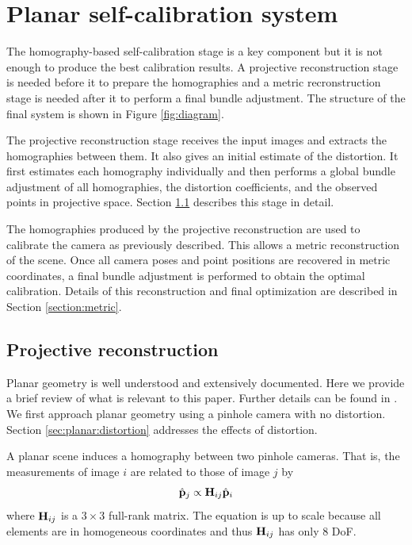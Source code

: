 \documentclass[10pt,twocolumn,letterpaper]{article}
\begin{document}
\section{Planar self-calibration system}

The homography-based self-calibration stage is a key component but it is not enough to produce the best calibration results. A projective reconstruction stage is needed before it to prepare the homographies and a metric recronstruction stage is needed after it to perform a final bundle adjustment. The structure of the final system is shown in Figure \ref{fig:diagram}.

The projective reconstruction stage receives the input images and extracts the homographies between them. It also gives an initial estimate of the distortion. It first estimates each homography individually and then performs a global bundle adjustment of all homographies, the distortion coefficients, and the observed points in projective space. Section \ref{sec:projective} describes this stage in detail.

The homographies produced by the projective reconstruction are used to calibrate the camera as previously described. This allows a metric reconstruction of the scene. Once all camera poses and point positions are recovered in metric coordinates, a final bundle adjustment is performed to obtain the optimal calibration. Details of this reconstruction and final optimization are described in Section \ref{section:metric}.


\subsection{Projective reconstruction}
\label{sec:projective}

Planar geometry is well understood and extensively documented. Here we provide a brief review of what is relevant to this paper. Further details can be found in \cite{hartley2000}. We first approach planar geometry using a pinhole camera with no distortion. Section \ref{sec:planar:distortion} addresses the effects of distortion.

A planar scene induces a homography between two pinhole cameras. That is, the measurements of image $i$ are related to those of image $j$ by
%
\begin{align}
\hat{\mathbf{p}}_j \propto \mathbf{H}_{ij} \hat{\mathbf{p}}_i 
\label{eq:homography}
\end{align}
%
where $\mathbf{H}_{ij}$ is a $3 \times 3$ full-rank matrix. The equation is up to scale because all elements are in homogeneous coordinates and thus $\mathbf{H}_{ij}$ has only 8 DoF.
\end{document}
